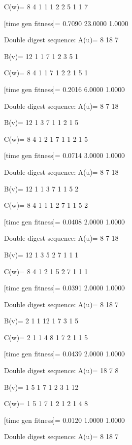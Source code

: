 C(w)=
     8     4     1     1     1     2     2     5     1     1     7

[time gen fitness]=
    0.7090   23.0000    1.0000

Double digest sequence:
A(u)=
     8    18     7

B(v)=
    12     1     1     7     1     2     3     5     1

C(w)=
     8     4     1     1     7     1     2     2     1     5     1

[time gen fitness]=
    0.2016    6.0000    1.0000

Double digest sequence:
A(u)=
     8     7    18

B(v)=
    12     1     3     7     1     1     2     1     5

C(w)=
     8     4     1     2     1     7     1     1     2     1     5

[time gen fitness]=
    0.0714    3.0000    1.0000

Double digest sequence:
A(u)=
     8     7    18

B(v)=
    12     1     1     3     7     1     1     5     2

C(w)=
     8     4     1     1     1     2     7     1     1     5     2

[time gen fitness]=
    0.0408    2.0000    1.0000

Double digest sequence:
A(u)=
     8     7    18

B(v)=
    12     1     3     5     2     7     1     1     1

C(w)=
     8     4     1     2     1     5     2     7     1     1     1

[time gen fitness]=
    0.0391    2.0000    1.0000

Double digest sequence:
A(u)=
     8    18     7

B(v)=
     2     1     1    12     1     7     3     1     5

C(w)=
     2     1     1     4     8     1     7     2     1     1     5

[time gen fitness]=
    0.0439    2.0000    1.0000

Double digest sequence:
A(u)=
    18     7     8

B(v)=
     1     5     1     7     1     2     3     1    12

C(w)=
     1     5     1     7     1     2     1     2     1     4     8

[time gen fitness]=
    0.0120    1.0000    1.0000

Double digest sequence:
A(u)=
     8    18     7

